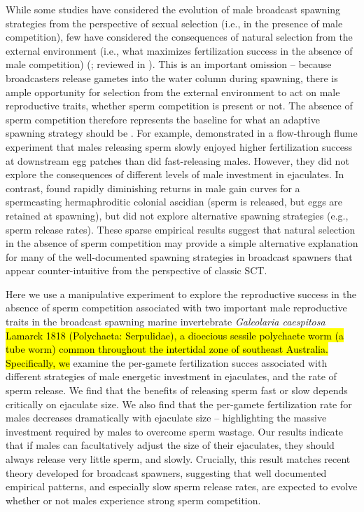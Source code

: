 \documentclass{article}
\begin{document}
While some studies have considered the evolution of male broadcast spawning strategies from the perspective of sexual selection (i.e., in the presence of male competition), few have considered the consequences of natural selection from the external environment (i.e., what maximizes fertilization success in the absence of male competition) (\citealt{Levitan2005}; reviewed in \citealt{LotterhosLevitan2011}). This is an important omission -- because broadcasters release gametes into the water column during spawning, there is ample opportunity for selection from the external environment to act on male reproductive traits, whether sperm competition is present or not. The absence of sperm competition therefore represents the baseline for what an adaptive spawning strategy should be \citep{MarshallBolton2007}. For example, \citet{MarshallBolton2007} demonstrated in a flow-through flume experiment that males releasing sperm slowly enjoyed higher fertilization success at downstream egg patches than did fast-releasing males. However, they did not explore the consequences of different levels of male investment in ejaculates. In contrast, \citet{JohnsonYund2009} found rapidly diminishing returns in male gain curves for a spermcasting hermaphroditic colonial ascidian (sperm is released, but eggs are retained at spawning), but did not explore alternative spawning strategies (e.g., sperm release rates). These sparse empirical results suggest that natural selection in the absence of sperm competition may provide a simple alternative explanation for many of the well-documented spawning strategies in broadcast spawners that appear counter-intuitive from the perspective of classic SCT. 

Here we use a manipulative experiment to explore the reproductive success in the absence of sperm competition associated with two important male reproductive traits in the broadcast spawning marine invertebrate \textit{Galeolaria caespitosa} \hl{Lamarck 1818 (Polychaeta: Serpulidae), a dioecious sessile polychaete worm (a tube worm) common throughout the intertidal zone of southeast Australia. Specifically, we }examine the per-gamete fertilization succes associated with different strategies of male energetic investment in ejaculates, and the rate of sperm release. We find that the benefits of releasing sperm fast or slow depends critically on ejaculate size. We also find that the per-gamete fertilization rate for males decreases dramatically with ejaculate size -- highlighting the massive investment required by males to overcome sperm wastage. Our results indicate that if males can facultatively adjust the size of their ejaculates, they should always release very little sperm, and slowly. Crucially, this result matches recent theory developed for broadcast spawners, suggesting that well documented empirical patterns, and especially slow sperm release rates, are expected to evolve whether or not males experience strong sperm competition.
\end{document}

